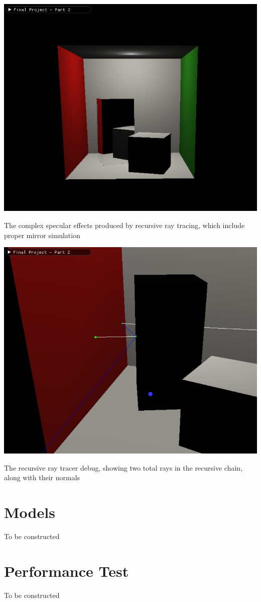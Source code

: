 \documentclass{article}
\begin{document}
    \begin{center}
        \includegraphics[scale=0.70]{images/recursive_ray_tracer_showcase.png}

        The complex specular effects produced by recursive ray tracing, which include proper mirror simulation

        \vspace{5mm}

        \includegraphics[scale=0.70]{images/recursive_ray_tracer_debug.png}

        The recursive ray tracer debug, showing two total rays in the recursive chain, along with their normals
    \end{center}

    \section{Models}
    To be constructed

    \section{Performance Test}
    To be constructed
\end{document}
